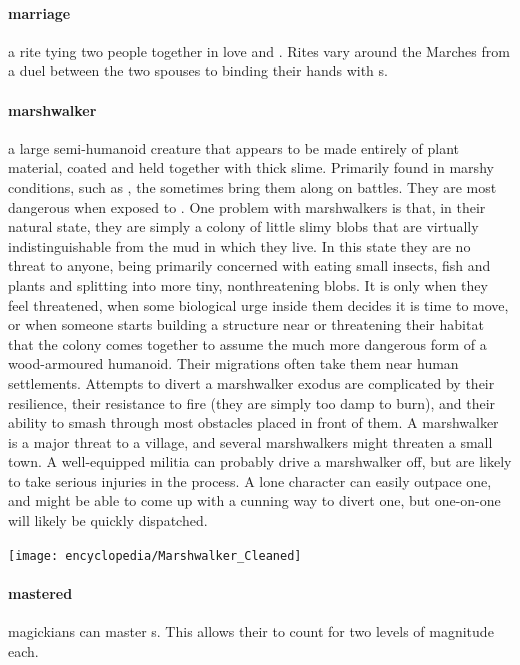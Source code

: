 \paragraph{marriage} a rite tying two people together in love and . Rites vary around the Marches from a duel between the two spouses to binding their hands with s.
\paragraph{marshwalker} a large semi-humanoid creature that appears to be made entirely of plant material, coated and held together with thick slime. Primarily found in marshy conditions, such as , the  sometimes bring them along on battles. They are most dangerous when exposed to . One problem with marshwalkers is that, in their natural state, they are simply a colony of little slimy blobs that are virtually indistinguishable from the mud in which they live. In this state they are no threat to anyone, being primarily concerned with eating small insects, fish and plants and splitting into more tiny, nonthreatening blobs. \localpar It is only when they feel threatened, when some biological urge inside them decides it is time to move, or when someone starts building a structure near or threatening their habitat that the colony comes together to assume the much more dangerous form of a wood-armoured humanoid. Their migrations often take them near human settlements. Attempts to divert a marshwalker exodus are complicated by their resilience, their resistance to fire (they are simply too damp to burn), and their ability to smash through most obstacles placed in front of them. \localpar A marshwalker is a major threat to a village, and several marshwalkers might threaten a small town. A well-equipped militia can probably drive a marshwalker off, but are likely to take serious injuries in the process. A lone character can easily outpace one, and might be able to come up with a cunning way to divert one, but one-on-one will likely be quickly dispatched. \begin{center}\texttt{[image: encyclopedia/Marshwalker\_Cleaned]}\end{center}
\paragraph{mastered} magickians can master s. This allows their  to count for two levels of magnitude each.
